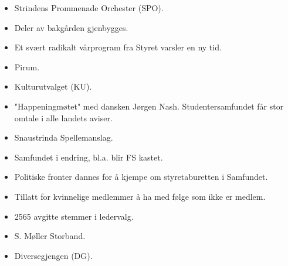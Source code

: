 
\begin{itemize}
  \item Strindens Prommenade Orchester (SPO).
  \item Deler av bakgården gjenbygges.
\end{itemize}


\begin{itemize}
  \item Et svært radikalt vårprogram fra Styret varsler en ny tid.
  \item Pirum.
\end{itemize}


\begin{itemize}
  \item Kulturutvalget (KU). 
\end{itemize}


\begin{itemize}
  \item "Happeningmøtet" med dansken Jørgen Nash. Studentersamfundet får stor omtale i alle landets aviser.
  \item Snaustrinda Spellemanslag.
\end{itemize}


\begin{itemize}
  \item Samfundet i endring, bl.a. blir FS kastet.
  \item Politiske fronter dannes for å kjempe om styretaburetten i Samfundet. 
\end{itemize}


\begin{itemize}
  \item Tillatt for kvinnelige medlemmer å ha med følge som ikke er medlem.
\end{itemize}


\begin{itemize}
  \item 2565 avgitte stemmer i ledervalg.
  \item S. Møller Storband.
\end{itemize}


\begin{itemize}
  \item Diversegjengen (DG).
\end{itemize}

